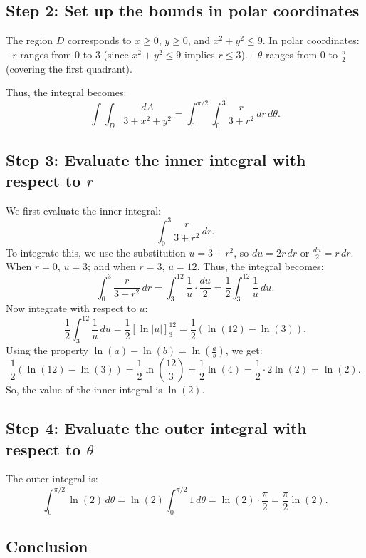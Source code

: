 \documentclass[11pt]{article}
\begin{document}
\subsection{Step 2: Set up the bounds in polar coordinates}

The region \( D \) corresponds to \( x \geq 0 \), \( y \geq 0 \), and \( x^2 + y^2 \leq 9 \). In polar coordinates:
- \( r \) ranges from \( 0 \) to \( 3 \) (since \( x^2 + y^2 \leq 9 \) implies \( r \leq 3 \)).
- \( \theta \) ranges from \( 0 \) to \( \frac{\pi}{2} \) (covering the first quadrant).

Thus, the integral becomes:
\[
\int \int_{D} \frac{dA}{3 + x^2 + y^2} = \int_{0}^{\pi/2} \int_{0}^{3} \frac{r}{3 + r^2} \, dr \, d\theta.
\]
\newpage

\subsection{Step 3: Evaluate the inner integral with respect to \( r \)}

We first evaluate the inner integral:
\[
\int_{0}^{3} \frac{r}{3 + r^2} \, dr.
\]
To integrate this, we use the substitution \( u = 3 + r^2 \), so \( du = 2r \, dr \) or \( \frac{du}{2} = r \, dr \). When \( r = 0 \), \( u = 3 \); and when \( r = 3 \), \( u = 12 \). Thus, the integral becomes:
\[
\int_{0}^{3} \frac{r}{3 + r^2} \, dr = \int_{3}^{12} \frac{1}{u} \cdot \frac{du}{2} = \frac{1}{2} \int_{3}^{12} \frac{1}{u} \, du.
\]
Now integrate with respect to \( u \):
\[
\frac{1}{2} \int_{3}^{12} \frac{1}{u} \, du = \frac{1}{2} \left[ \ln |u| \right]_{3}^{12} = \frac{1}{2} \left( \ln(12) - \ln(3) \right).
\]
Using the property \( \ln(a) - \ln(b) = \ln\left( \frac{a}{b} \right) \), we get:
\[
\frac{1}{2} \left( \ln(12) - \ln(3) \right) = \frac{1}{2} \ln\left( \frac{12}{3} \right) = \frac{1}{2} \ln(4) = \frac{1}{2} \cdot 2 \ln(2) = \ln(2).
\]
So, the value of the inner integral is \( \ln(2) \).
\newpage

\subsection{Step 4: Evaluate the outer integral with respect to \( \theta \)}

The outer integral is:
\[
\int_{0}^{\pi/2} \ln(2) \, d\theta = \ln(2) \int_{0}^{\pi/2} 1 \, d\theta = \ln(2) \cdot \frac{\pi}{2} = \frac{\pi}{2} \ln(2).
\]
\newpage

\subsection{Conclusion}
\end{document}
